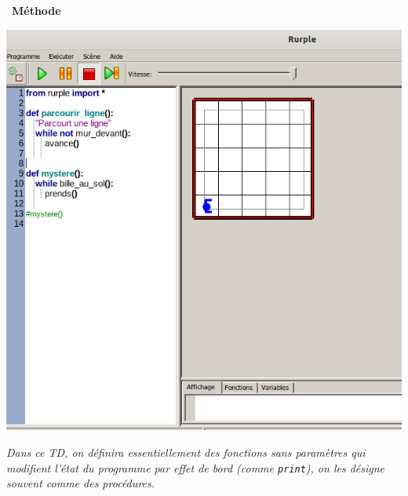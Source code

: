 \documentclass[a4paper, french, 12pt]{article}  %
\newcounter{prog}
\newenvironment{methode}[1]
{\par \medskip    \noindent  
 \begin {bclogo}[arrondi =0.1,logo=\bcoutil, marge=4,noborder = true] {~\textbf{Méthode}   {\itshape #1} }  \par}
{
\end{bclogo}
 \par \bigskip }
\begin{document}
\begin{methode}{}
\begin{center}
 \includegraphics[scale=0.5]{images/rurple.png}
\end{center}

\end{methode}


{\itshape Dans ce TD, on définira essentiellement des fonctions sans paramètres qui modifient l'état du programme par effet de bord (comme \texttt{print}),  on les désigne souvent  comme des procédures.}
\end{document}
